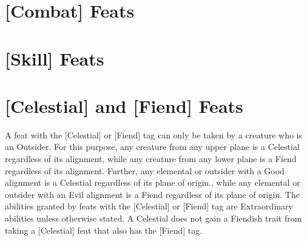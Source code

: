 \section{[Combat] Feats} \label{feats:combat}

	\begin{multicols}{2}

	

	\end{multicols}

	\section{[Skill] Feats}

	\begin{multicols}{2}

	

	\end{multicols}

\section{[Celestial] and [Fiend] Feats} \label{feats:outsider}

A feat with the [Celestial] or [Fiend] tag can only be taken by a creature who is an Outsider. For this purpose, any creature from any upper plane is a Celestial regardless of its alignment, while any creature from any lower plane is a Fiend regardless of its alignment. Further, any elemental or outsider with a Good alignment is a Celestial regardless of its plane of origin., while any elemental or outsider with an Evil alignment is a Fiend regardless of its plane of origin. The abilities granted by feats with the [Celestial] or [Fiend] tag are Extraordinary abilities unless otherwise stated. A Celestial does not gain a Fiendish trait from taking a [Celestial] feat that also has the [Fiend] tag.

	\begin{multicols}{2}

	

	\end{multicols}